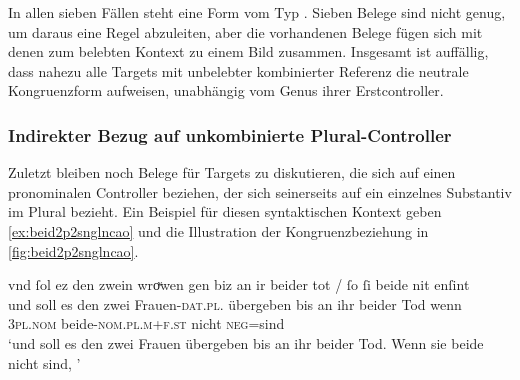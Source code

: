 In allen sieben Fällen steht eine Form vom Typ . Sieben Belege
sind nicht genug, um daraus eine Regel abzuleiten, aber die vorhandenen Belege
fügen sich mit denen zum belebten Kontext zu einem Bild zusammen. Insgesamt ist
auffällig, dass nahezu alle Targets mit unbelebter kombinierter Referenz die
neutrale Kongruenzform  aufweisen, unabhängig vom Genus ihrer
Erstcontroller.

\subsubsection{Indirekter Bezug auf unkombinierte Plural-Controller}
\label{subsubsec:beid2p2snglncao}

Zuletzt bleiben noch Belege für Targets zu diskutieren, die sich auf einen
pronominalen Controller beziehen, der sich seinerseits auf ein einzelnes
Substantiv im Plural bezieht. Ein Beispiel für diesen syntaktischen Kontext
geben \cref{ex:beid2p2snglncao} und die Illustration der Kongruenzbeziehung in
\cref{fig:beid2p2snglncao}.

\begin{exe}
\ex \label{ex:beid2p2snglncao}
	\gll vnd ſol ez den zwein wroͮwen gen biz an ir beider tot / ſo
		ſi beide nit enſint \textelp{} \\
		und soll es den zwei Frauen-\textsc{dat.pl.\FemF} übergeben bis an ihr
		beider Tod {} wenn \textsc{3pl\subF.nom} beide-\textsc{nom.pl.m+f\subF.st}
		nicht \textsc{neg}=sind {} \\
	\trans `und soll es den zwei Frauen übergeben bis an ihr beider Tod.
		Wenn sie beide nicht  sind, \textelp{}'
		\parencites(Nr.~2568, Sirnau, Kr.~Esslingen, 1297)[3,31]{cao4}
\end{exe}

